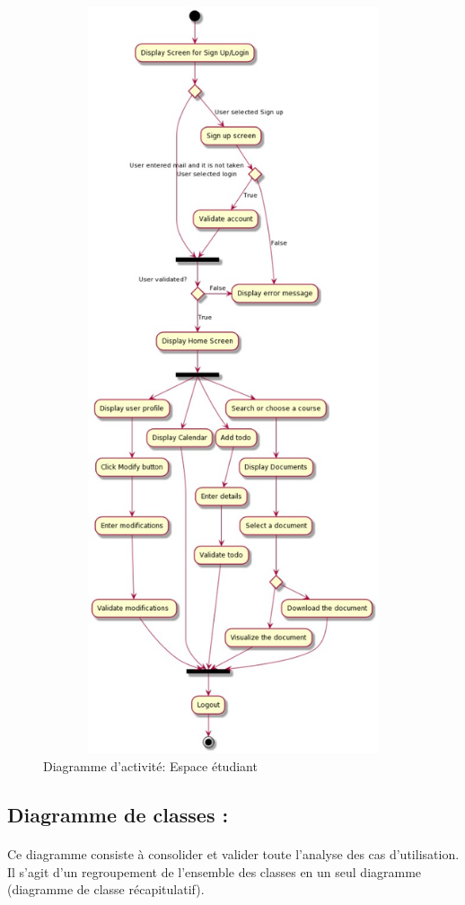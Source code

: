 \documentclass{article}
\begin{document}
{\begin{figure}[H]
    \center
    \includegraphics[width=17cm,height=22cm]{big.jpeg}
    \caption{Diagramme d'activité: Espace étudiant}
    \label{fig:Diagramme de séquaneces: Ajouter un module.}
\end{figure}

\vspace{1cm}
\subsection{Diagramme de classes :}
\onehalfspacing\paragraph{}{Ce diagramme consiste à consolider et valider toute l'analyse des cas d'utilisation. Il s'agit d'un regroupement
de l'ensemble des classes en un seul diagramme (diagramme de classe récapitulatif).}

}
\end{document}
